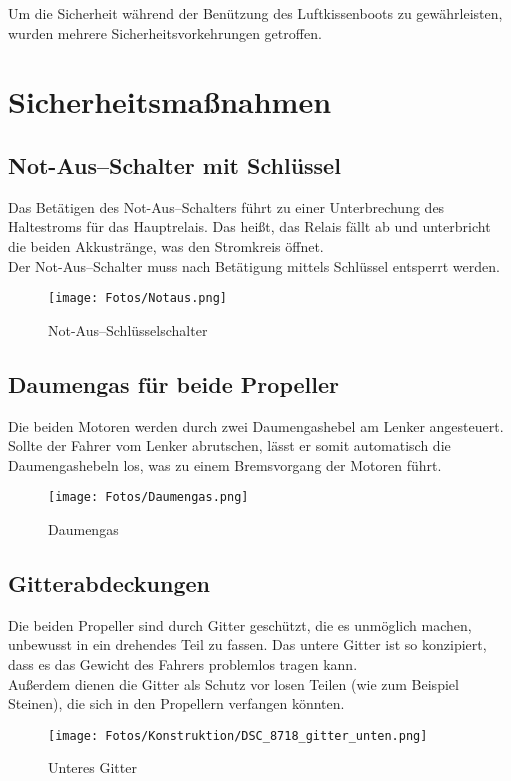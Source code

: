 Um die Sicherheit während der Benützung des Luftkissenboots zu gewährleisten, wurden mehrere Sicherheitsvorkehrungen getroffen. 
\section{Sicherheitsmaßnahmen}
\subsection{Not-Aus--Schalter mit Schlüssel}
Das Betätigen des Not-Aus--Schalters führt zu einer Unterbrechung des Haltestroms für das Hauptrelais. Das heißt, das Relais fällt ab und unterbricht die beiden Akkustränge, was den Stromkreis öffnet.\\
Der Not-Aus--Schalter muss nach Betätigung mittels Schlüssel entsperrt werden.
\begin{figure}[h]
    \centering
    \texttt{[image: Fotos/Notaus.png]}
    \caption{Not-Aus--Schlüsselschalter}    
\end{figure}

\clearpage
\subsection{Daumengas für beide Propeller}
Die beiden Motoren werden durch zwei Daumengashebel am Lenker angesteuert. Sollte der Fahrer vom Lenker abrutschen, lässt er somit automatisch die Daumengashebeln los, was zu einem Bremsvorgang der Motoren führt.
\begin{figure}[h]
    \centering
    \texttt{[image: Fotos/Daumengas.png]}
    \caption{Daumengas}    
\end{figure}

\newpage
\subsection{Gitterabdeckungen}
Die beiden Propeller sind durch Gitter geschützt, die es unmöglich machen, unbewusst in ein drehendes Teil zu fassen. Das untere Gitter ist so konzipiert, dass es das Gewicht des Fahrers problemlos tragen kann.\\
Außerdem dienen die Gitter als Schutz vor losen Teilen (wie zum Beispiel Steinen), die sich in den Propellern verfangen könnten.
\begin{figure}[H]
    \centering
    \texttt{[image: Fotos/Konstruktion/DSC\_8718\_gitter\_unten.png]}
    \caption{Unteres Gitter}    
\end{figure}

